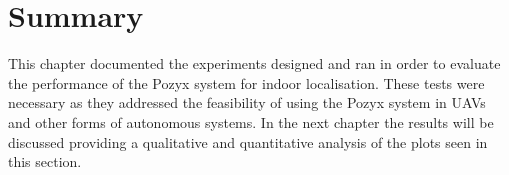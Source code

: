 \section{Summary}
This chapter documented the experiments designed and ran in order to evaluate the performance of the Pozyx system for indoor localisation.
These tests were necessary as they addressed the feasibility of using the Pozyx system in UAVs and other forms of autonomous systems.
In the next chapter the results will be discussed providing a qualitative and quantitative analysis of the plots seen in this section.

